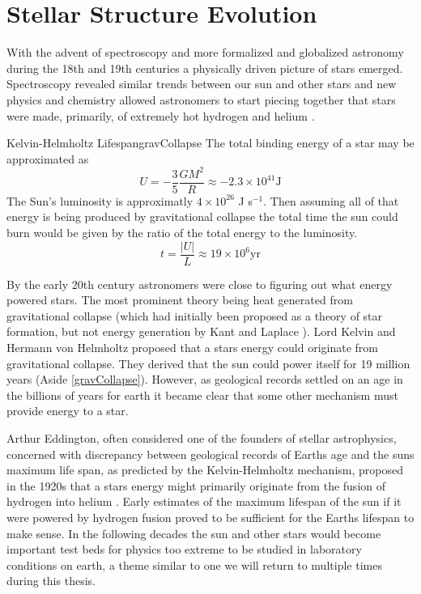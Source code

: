 \chapter{Stellar Structure Evolution}
With the advent of spectroscopy and more formalized and globalized astronomy
during the 18th and 19th centuries a physically driven picture of stars emerged.
Spectroscopy revealed similar trends between our sun and other stars and new
physics and chemistry allowed astronomers to start piecing together that stars
were made, primarily, of extremely hot hydrogen and helium \addcite.

\begin{sidebar}{Kelvin-Helmholtz Lifespan}{gravCollapse}
  The total binding energy of a star may be approximated as
  \begin{equation*}
    U = -\frac{3}{5}\frac{GM^{2}}{R} \approx -2.3 \times 10^{41} \text{J}
  \end{equation*}
  The Sun's luminosity is approximatly $4\times 10^{26}$ J s$^{-1}$. Then
  assuming all of that energy is being produced by gravitational collapse the
  total time the sun could burn would be given by the ratio of the total energy
  to the luminosity.
  \begin{equation*}
    t = \frac{|U|}{L} \approx 19 \times 10^{6} \text{yr}
  \end{equation*}
\end{sidebar}

By the early 20th century astronomers were close to figuring out what energy
powered stars. The most prominent theory being heat generated from
gravitational collapse (which had initially been proposed as a theory of star
formation, but not energy generation by Kant and Laplace \addcite). Lord Kelvin
and Hermann von Helmholtz proposed that a stars energy could originate from
gravitational collapse. They derived that the sun could power itself for 19
million years \addcite (Aside \ref{gravCollapse}). However, as
geological records settled on an age in the billions of years for earth it
became clear that some other mechanism must provide energy to a star.

Arthur Eddington, often considered one of the founders of stellar astrophysics,
concerned with discrepancy between geological records of Earths age and the
suns maximum life span, as predicted by the Kelvin-Helmholtz mechanism,
proposed in the 1920s that a stars energy might primarily originate from the
fusion of hydrogen into helium \addcite. Early estimates of the maximum
lifespan of the sun if it were powered by hydrogen fusion proved to be
sufficient for the Earths lifespan to make sense. In the following decades the
sun and other stars would become important test beds for physics too extreme to
be studied in laboratory conditions on earth, a theme similar to one we will
return to multiple times during this thesis.

